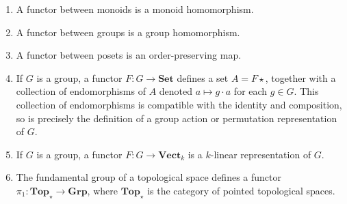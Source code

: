 \begin{example}
\begin{enumerate}
        \item A functor between monoids is a monoid homomorphism.
        \item A functor between groups is a group homomorphism.
        \item A functor between posets is an order-preserving map.
        \item If \( G \) is a group, a functor \( F : G \to \mathbf{Set} \) defines a set \( A = F \star \), together with a collection of endomorphisms of \( A \) denoted \( a \mapsto g \cdot a \) for each \( g \in G \).
        This collection of endomorphisms is compatible with the identity and composition, so is precisely the definition of a group action or permutation representation of \( G \).
        \item If \( G \) is a group, a functor \( F : G \to \mathbf{Vect}_k \) is a \( k \)-linear representation of \( G \).
        \item The fundamental group of a topological space defines a functor \( \pi_1 : \mathbf{Top}_\star \to \mathbf{Grp} \), where \( \mathbf{Top}_\star \) is the category of pointed topological spaces.
    \end{enumerate}
\end{example}

